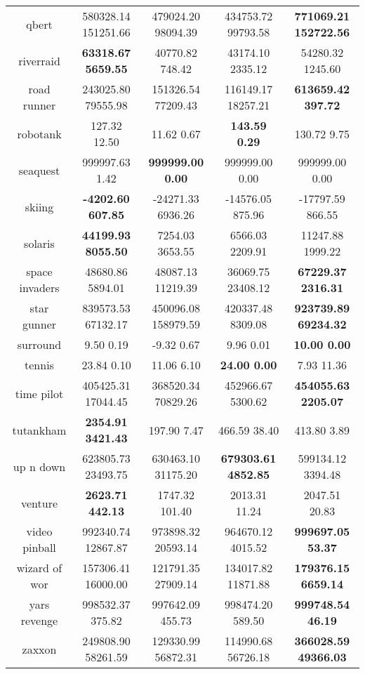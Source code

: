 \documentclass{article}
\begin{document}
\begin{tabular}{|c|c|c|c|c|}
 qbert & 580328.14  151251.66 & 479024.20  98094.39 & 434753.72  99793.58 & \bf{771069.21  152722.56} \\
 riverraid & \bf{63318.67  5659.55} & 40770.82  748.42 & 43174.10  2335.12 & 54280.32  1245.60 \\
 road runner & 243025.80  79555.98 & 151326.54  77209.43 & 116149.17  18257.21 & \bf{613659.42  397.72} \\
 robotank & 127.32  12.50 & 11.62  0.67 & \bf{143.59  0.29} & 130.72  9.75 \\
 seaquest & 999997.63  1.42 & \bf{999999.00  0.00} & 999999.00  0.00 & 999999.00  0.00 \\
 skiing & \bf{-4202.60  607.85} & -24271.33  6936.26 & -14576.05  875.96 & -17797.59  866.55 \\
 solaris & \bf{44199.93  8055.50} & 7254.03  3653.55 & 6566.03  2209.91 & 11247.88  1999.22 \\
 space invaders & 48680.86  5894.01 & 48087.13  11219.39 & 36069.75  23408.12 & \bf{67229.37  2316.31} \\
 star gunner & 839573.53  67132.17 & 450096.08  158979.59 & 420337.48  8309.08 & \bf{923739.89  69234.32} \\
 surround & 9.50  0.19 & -9.32  0.67 & 9.96  0.01 & \bf{10.00  0.00} \\
 tennis & 23.84  0.10 & 11.06  6.10 & \bf{24.00  0.00} & 7.93  11.36 \\
 time pilot & 405425.31  17044.45 & 368520.34  70829.26 & 452966.67  5300.62 & \bf{454055.63  2205.07} \\
 tutankham & \bf{2354.91  3421.43} & 197.90  7.47 & 466.59  38.40 & 413.80  3.89 \\
 up n down & 623805.73  23493.75 & 630463.10  31175.20 & \bf{679303.61  4852.85} & 599134.12  3394.48 \\
 venture & \bf{2623.71  442.13} & 1747.32  101.40 & 2013.31  11.24 & 2047.51  20.83 \\
 video pinball & 992340.74  12867.87 & 973898.32  20593.14 & 964670.12  4015.52 & \bf{999697.05  53.37} \\
 wizard of wor & 157306.41  16000.00 & 121791.35  27909.14 & 134017.82  11871.88 & \bf{179376.15  6659.14} \\
 yars revenge & 998532.37  375.82 & 997642.09  455.73 & 998474.20  589.50 & \bf{999748.54  46.19} \\
 zaxxon & 249808.90  58261.59 & 129330.99  56872.31 & 114990.68  56726.18 & \bf{366028.59  49366.03} \\
\hline
\end{tabular}
\normalsize
\clearpage
\end{document}
